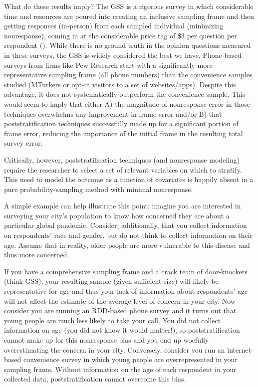 \documentclass[a4paper,12pt]{article}
\theoremstyle{proposition}
\begin{document}
What do these results imply? The GSS is a rigorous survey in which considerable time and resources are poured into creating an inclusive sampling frame and then getting responses (in-person) from each sampled individual (minimizing nonresponse), coming in at the considerable price tag of \$3 per question per respondent (\cite{Goel2015}). While there is no ground truth in the opinion questions measured in these surveys, the GSS is widely considered the best we have. Phone-based surveys from firms like Pew Research start with a significantly more representative sampling frame (all phone numbers) than the convenience samples studied (MTurkers or opt-in visitors to a set of websites/apps). Despite this advantage, it does not systematically outperform the convenience sample. This would seem to imply that either A) the magnitude of nonresponse error in those techniques overwhelms any improvement in frame error and/or B) that poststratification techniques successfully made up for a significant portion of frame error, reducing the importance of the initial frame in the resulting total survey error.

Critically, however, poststratification techniques (and nonresponse modeling) require the researcher to select a set of relevant variables on which to stratify. This need to model the outcome as a function of covariates is happily absent in a pure probability-sampling method with minimal nonresponse.

A simple example can help illustrate this point: imagine you are interested in surveying your city’s population to know how concerned they are about a particular global pandemic. Consider, additionally, that you collect information on respondents’ race and gender, but do not think to collect information on their age. Assume that in reality, older people are more vulnerable to this disease and thus more concerned.

If you have a comprehensive sampling frame and a crack team of door-knockers (think GSS), your resulting sample (given sufficient size) will likely be representative for age and thus your lack of information about respondents’ age will not affect the estimate of the average level of concern in your city. Now consider you are running an RDD-based phone survey and it turns out that young people are much less likely to take your call. You did not collect information on age (you did not know it would matter!), so poststratification cannot make up for this nonresponse bias and you end up woefully overestimating the concern in your city. Conversely, consider you run an internet-based convenience survey in which young people are overrepresented in your sampling frame. Without information on the age of each respondent in your collected data, poststratification cannot overcome this bias.
\end{document}
